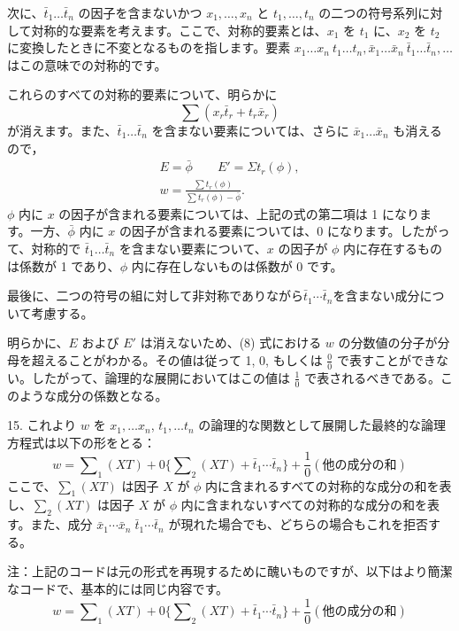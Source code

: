 \documentclass[a4paper,11pt,openany]{ltjsbook}
\begin{document}
次に、\(\bar{t}_1 \dotsc \bar{t}_n\) の因子を含まないかつ \(x_1, \dotsc, x_n\) と \(t_1, \dotsc, t_n\) の二つの符号系列に対して対称的な要素を考えます。ここで、対称的要素とは、\(x_1\) を \(t_1\) に、\(x_2\) を \(t_2\) に変換したときに不変となるものを指します。要素 \( x_1 \dotsc x_n\ t_1 \dotsc t_n, \bar{x}_1 \dotsc \bar{x}_n\ \bar{t}_1 \dotsc \bar{t}_n, \dotsc \) はこの意味での対称的です。

これらのすべての対称的要素について、明らかに
\[
\sum (x_r \bar{t}_r + t_r \bar{x}_r)
\]
が消えます。また、\(\bar{t}_1 \dotsc \bar{t}_n\) を含まない要素については、さらに \(\bar{x}_1 \dotsc \bar{x}_n\) も消えるので，
\begin{gather*}
E = \bar{\phi} \qquad E' = \Sigma t_r(\phi),   \\
w = \frac{\sum t_r(\phi)}{ \sum t_r(\phi) - \bar{\phi} }.
\end{gather*}
\(\phi\) 内に \(x\) の因子が含まれる要素については、上記の式の第二項は 1 になります。一方、\(\bar{\phi}\) 内に \(x\) の因子が含まれる要素については、0 になります。したがって、対称的で \(\bar{t}_1 \dotsc \bar{t}_n\) を含まない要素について、\(x\) の因子が \(\phi\) 内に存在するものは係数が 1 であり、\(\phi\) 内に存在しないものは係数が 0 です。

最後に、二つの符号の組に対して非対称でありながら$\bar{t}_1 \dotsm \bar{t}_n$を含まない成分について考慮する。

明らかに、$E$ および $E'$ は消えないため、(8) 式における $w$ の分数値の分子が分母を超えることがわかる。その値は従って 1, 0, もしくは $\frac{0}{0}$ で表すことができない。したがって、論理的な展開においてはこの値は $\frac{1}{0}$ で表されるべきである。このような成分の係数となる。

15. これより $w$ を $x_1, \dotsc x_n$, $t_1, \dotsc t_n$ の論理的な関数として展開した最終的な論理方程式は以下の形をとる：
\[
  w = \sum\nolimits_1 (XT)
  + 0\{ \sum\nolimits_2(XT) + \bar{t}_1\dotsm \bar{t}_n \}
  + \frac{1}{0}
  \left(\text{他の成分の和}\right) \tag{9}
\]
ここで、$\sum_1 (XT)$ は因子 $X$ が $\phi$ 内に含まれるすべての対称的な成分の和を表し、$\sum_2(XT)$ は因子 $X$ が $\phi$ 内に含まれないすべての対称的な成分の和を表す。また、成分 $\bar{x}_1 \dotsm \bar{x}_n\; \bar{t}_1 \dotsm \bar{t}_n$ が現れた場合でも、どちらの場合もこれを拒否する。

注：上記のコードは元の形式を再現するために醜いものですが、以下はより簡潔なコードで、基本的には同じ内容です。
\[
  w = \sum\nolimits_1 (XT)
  + 0\{ \sum\nolimits_2(XT) + \bar{t}_1\dotsm \bar{t}_n \}
  + \frac{1}{0} \left(\text{他の成分の和}\right) \tag{9}
\]
\end{document}
